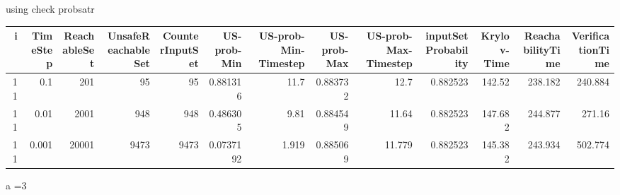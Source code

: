using check probsatr
\begin{tabular}{rrrrrrrrrrrrr}
\hline
   i &   TimeStep &   ReachableSet &   UnsafeReachableSet &   CounterInputSet &   US-prob-Min &   US-prob-Min-Timestep &   US-prob-Max &   US-prob-Max-Timestep &   inputSet Probability &   Krylov-Time &   ReachabilityTime &   VerificationTime \\
\hline
  11 &      0.1   &            201 &                   95 &                95 &     0.881316  &                 11.7   &      0.883732 &                 12.7   &               0.882523 &       142.52  &            238.182 &            240.884 \\
  11 &      0.01  &           2001 &                  948 &               948 &     0.486305  &                  9.81  &      0.884549 &                 11.64  &               0.882523 &       147.682 &            244.877 &            271.16  \\
  11 &      0.001 &          20001 &                 9473 &              9473 &     0.0737192 &                  1.919 &      0.885069 &                 11.779 &               0.882523 &       145.382 &            243.934 &            502.774 \\
\hline
\end{tabular}

a =3

